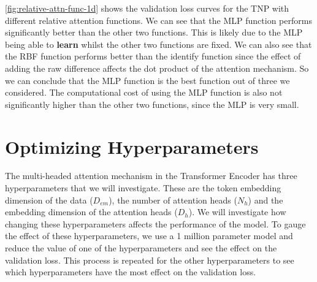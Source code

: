 \documentclass[../../main.tex]{subfiles}
\begin{document}
\autoref{fig:relative-attn-func-1d} shows the validation loss curves for the TNP with different relative attention functions. We can see that the MLP function performs significantly better than the other two functions. This is likely due to the MLP being able to \textbf{learn} whilst the other two functions are fixed. We can also see that the RBF function performs better than the identify function since the effect of adding the raw difference affects the dot product of the attention mechanism. So we can conclude that the MLP function is the best function out of three we considered. The computational cost of using the MLP function is also not significantly higher than the other two functions, since the MLP is very small.



\section{Optimizing Hyperparameters}

The multi-headed attention mechanism in the Transformer Encoder has three hyperparameters that we will investigate. These are
the token embedding dimension of the data ($D_{em}$), the number of attention heads ($N_h$) and the embedding dimension of the attention heads ($D_h$). We will investigate how changing these hyperparameters affects the performance of the model. To gauge the effect of these hyperparameters, we use a 1 million parameter model and reduce the value of one of the hyperparameters and see the effect on the validation loss. This process is repeated for the other hyperparameters to see which hyperparameters have the most effect on the validation loss. 
\end{document}
